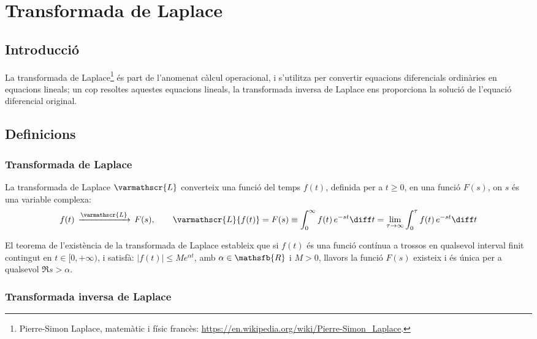 
\chapter{Transformada de Laplace}\label{sec:ch-laplace}

\section{Introducció}
La transformada de Laplace\footnote{Pierre-Simon Laplace, matemàtic i físic francès: \href{https://en.wikipedia.org/wiki/Pierre-Simon_Laplace}{https:/\!\!/en.wikipedia.org/wiki/Pierre-Simon\_Laplace}.} és part de l'anomenat càlcul operacional,
i s'utilitza per convertir equacions diferencials ordinàries en
equacions lineals; un cop resoltes aquestes equacions lineals, la
transformada inversa de Laplace ens proporciona la solució de
l'equació diferencial original.

\section{Definicions}

\subsection{Transformada de Laplace}

La transformada de Laplace $\varmathscr{L}$  converteix una funció del
temps $f(t)$, definida per a $t\geq 0$, en una funció $F(s)$, on $s$
és una variable complexa:
\begin{equation}
	f(t)\,\xrightarrow{\varmathscr{L}}\,F(s), \qquad
    \varmathscr{L}\{f(t)\} = F(s) \equiv \int_0^\infty f(t) \,e^{-s t} \diff t =
    \lim_{\tau\to\infty} \int_0^\tau f(t) \,e^{-s t} \diff t \label{eq:transf_laplace}
\end{equation}

El teorema de l'existència de la transformada de Laplace estableix
que si $f(t)$ és una funció contínua a trossos en qualsevol
interval finit contingut en $t \in [0,+\infty)$, i satisfà: $|f(t)| \leq M
e^{\alpha t}$, amb $\alpha \in \mathsfb{R}$ i $M > 0$,  llavors la
funció $F(s)$ existeix i és única per a
qualsevol $\Re s > \alpha$.

\subsection{Transformada inversa de Laplace}

